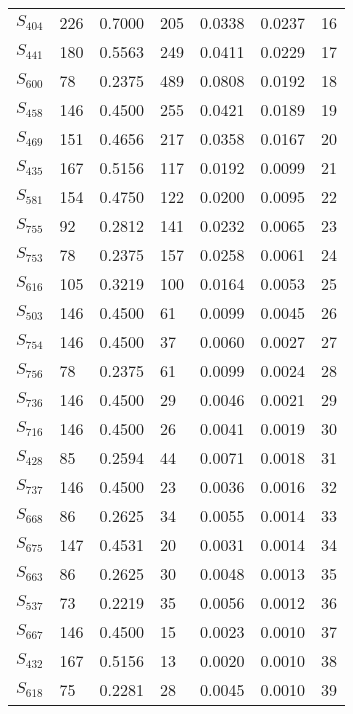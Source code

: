\begin{xltabular}{\textwidth}{XPPPPPP}
  $S_{404}$ & 226 & 0.7000 & 205 & 0.0338 & 0.0237 & 16 \\ 
  $S_{441}$ & 180 & 0.5563 & 249 & 0.0411 & 0.0229 & 17 \\ 
  $S_{600}$ & 78 & 0.2375 & 489 & 0.0808 & 0.0192 & 18 \\ 
  $S_{458}$ & 146 & 0.4500 & 255 & 0.0421 & 0.0189 & 19 \\ 
  $S_{469}$ & 151 & 0.4656 & 217 & 0.0358 & 0.0167 & 20 \\ 
  $S_{435}$ & 167 & 0.5156 & 117 & 0.0192 & 0.0099 & 21 \\ 
  $S_{581}$ & 154 & 0.4750 & 122 & 0.0200 & 0.0095 & 22 \\ 
  $S_{755}$ & 92 & 0.2812 & 141 & 0.0232 & 0.0065 & 23 \\ 
  $S_{753}$ & 78 & 0.2375 & 157 & 0.0258 & 0.0061 & 24 \\ 
  $S_{616}$ & 105 & 0.3219 & 100 & 0.0164 & 0.0053 & 25 \\ 
  $S_{503}$ & 146 & 0.4500 & 61 & 0.0099 & 0.0045 & 26 \\ 
  $S_{754}$ & 146 & 0.4500 & 37 & 0.0060 & 0.0027 & 27 \\ 
  $S_{756}$ & 78 & 0.2375 & 61 & 0.0099 & 0.0024 & 28 \\ 
  $S_{736}$ & 146 & 0.4500 & 29 & 0.0046 & 0.0021 & 29 \\ 
  $S_{716}$ & 146 & 0.4500 & 26 & 0.0041 & 0.0019 & 30 \\ 
  $S_{428}$ & 85 & 0.2594 & 44 & 0.0071 & 0.0018 & 31 \\ 
  $S_{737}$ & 146 & 0.4500 & 23 & 0.0036 & 0.0016 & 32 \\ 
  $S_{668}$ & 86 & 0.2625 & 34 & 0.0055 & 0.0014 & 33 \\ 
  $S_{675}$ & 147 & 0.4531 & 20 & 0.0031 & 0.0014 & 34 \\ 
  $S_{663}$ & 86 & 0.2625 & 30 & 0.0048 & 0.0013 & 35 \\ 
  $S_{537}$ & 73 & 0.2219 & 35 & 0.0056 & 0.0012 & 36 \\ 
  $S_{667}$ & 146 & 0.4500 & 15 & 0.0023 & 0.0010 & 37 \\ 
  $S_{432}$ & 167 & 0.5156 & 13 & 0.0020 & 0.0010 & 38 \\ 
  $S_{618}$ & 75 & 0.2281 & 28 & 0.0045 & 0.0010 & 39 \\ 

\end{xltabular}
